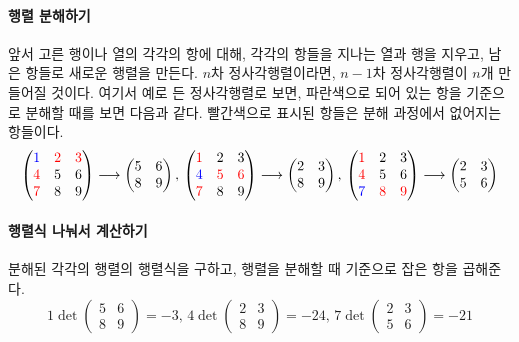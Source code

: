 \documentclass{scrartcl}
\begin{document}
\paragraph{행렬 분해하기} 앞서 고른 행이나 열의 각각의 항에 대해, 각각의 항들을 지나는 열과 행을 지우고, 남은 항들로 새로운 행렬을 만든다. $n$차 정사각행렬이라면, $n-1$차 정사각행렬이 $n$개 만들어질 것이다. 여기서 예로 든 정사각행렬로 보면, 파란색으로 되어 있는 항을 기준으로 분해할 때를 보면 다음과 같다. 빨간색으로 표시된 항들은 분해 과정에서 없어지는 항들이다.
\[
\begin{pmatrix}
\color{blue}1 & \color{red}2 & \color{red}3\\
\color{red}4 & 5 & 6\\
\color{red}7 & 8 & 9
\end{pmatrix}\longrightarrow\begin{pmatrix}
5 & 6\\
8 & 9
\end{pmatrix},\,
\begin{pmatrix}
\color{red}1 & 2 & 3\\
\color{blue}4 & \color{red}5 & \color{red}6\\
\color{red}7 & 8 & 9
\end{pmatrix}\longrightarrow\begin{pmatrix}
2 & 3\\
8 & 9
\end{pmatrix},\,
\begin{pmatrix}
\color{red}1 & 2 & 3\\
\color{red}4 & 5 & 6\\
\color{blue}7 & \color{red}8 & \color{red}9
\end{pmatrix}\longrightarrow\begin{pmatrix}
2 & 3\\
5 & 6
\end{pmatrix}
\]
\paragraph{행렬식 나눠서 계산하기} 분해된 각각의 행렬의 행렬식을 구하고, 행렬을 분해할 때 기준으로 잡은 항을 곱해준다.
\[
1\det\begin{pmatrix}
5 & 6\\
8 & 9
\end{pmatrix}=-3,\,
4\det\begin{pmatrix}
2 & 3\\
8 & 9
\end{pmatrix}=-24,\,
7\det\begin{pmatrix}
2 & 3\\
5 & 6
\end{pmatrix}=-21
\]
\end{document}
